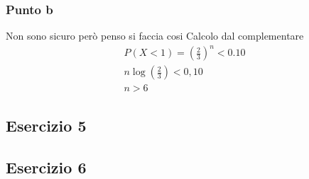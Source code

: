 \documentclass[12pt]{article}
\begin{document}
\subsubsection*{Punto b}
Non sono sicuro però penso si faccia cosi
\newline
Calcolo dal complementare
\begin{align*}
    P(X<1) = \left(\frac{2}{3}\right)^n < 0.10 \\
    n\log(\frac{2}{3}) < 0,10 \\
    n > 6
\end{align*}

\subsection*{Esercizio 5}

\subsection*{Esercizio 6}
\end{document}
